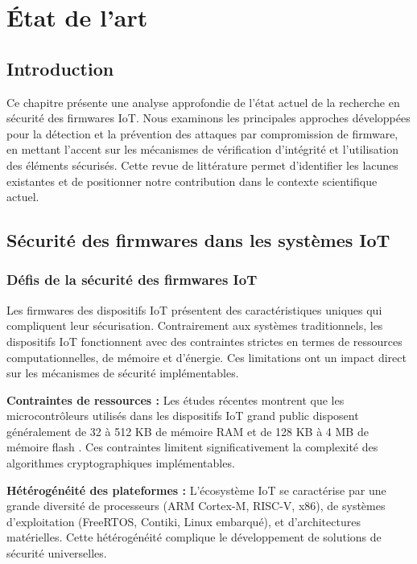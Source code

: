 
\chapter{État de l'art}
\label{chap:state-of-art}

\section{Introduction}

Ce chapitre présente une analyse approfondie de l'état actuel de la recherche en sécurité des firmwares IoT. Nous examinons les principales approches développées pour la détection et la prévention des attaques par compromission de firmware, en mettant l'accent sur les mécanismes de vérification d'intégrité et l'utilisation des éléments sécurisés. Cette revue de littérature permet d'identifier les lacunes existantes et de positionner notre contribution dans le contexte scientifique actuel.

\section{Sécurité des firmwares dans les systèmes IoT}

\subsection{Défis de la sécurité des firmwares IoT}

Les firmwares des dispositifs IoT présentent des caractéristiques uniques qui compliquent leur sécurisation. Contrairement aux systèmes traditionnels, les dispositifs IoT fonctionnent avec des contraintes strictes en termes de ressources computationnelles, de mémoire et d'énergie. Ces limitations ont un impact direct sur les mécanismes de sécurité implémentables.

\textbf{Contraintes de ressources :} Les études récentes montrent que les microcontrôleurs utilisés dans les dispositifs IoT grand public disposent généralement de 32 à 512 KB de mémoire RAM et de 128 KB à 4 MB de mémoire flash \cite{Khan2024EfficiencySecurity}. Ces contraintes limitent significativement la complexité des algorithmes cryptographiques implémentables.

\textbf{Hétérogénéité des plateformes :} L'écosystème IoT se caractérise par une grande diversité de processeurs (ARM Cortex-M, RISC-V, x86), de systèmes d'exploitation (FreeRTOS, Contiki, Linux embarqué), et d'architectures matérielles. Cette hétérogénéité complique le développement de solutions de sécurité universelles.

